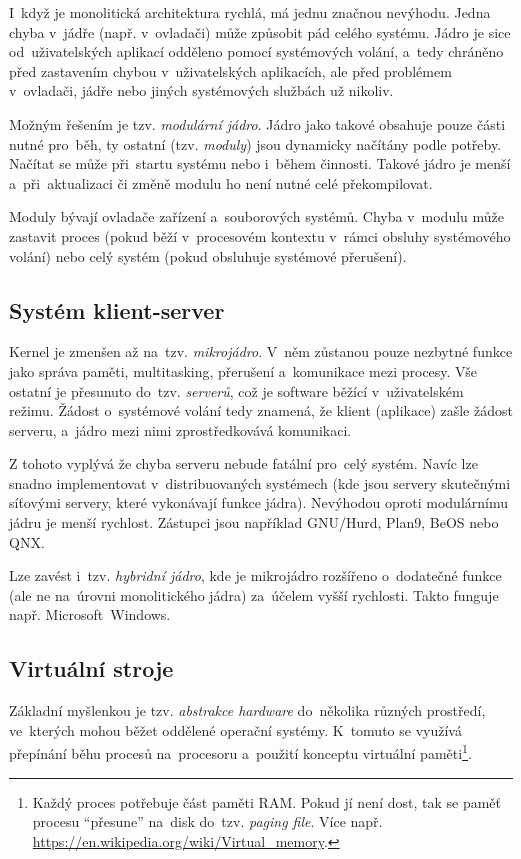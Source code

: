I~když je monolitická architektura rychlá, má jednu značnou nevýhodu. Jedna chyba v~jádře (např. v~ovladači) může způsobit pád celého systému. Jádro je sice od~uživatelských aplikací odděleno pomocí systémových volání, a~tedy chráněno před zastavením chybou v~uživatelských aplikacích, ale před problémem v~ovladači, jádře nebo jiných systémových službách už nikoliv.

Možným řešením je tzv. \emph{modulární jádro}. Jádro jako takové obsahuje pouze části nutné pro~běh, ty ostatní (tzv. \emph{moduly}) jsou dynamicky načítány podle potřeby. Načítat se může při~startu systému nebo i~během činnosti. Takové jádro je menší a~při~aktualizaci či změně modulu ho není nutné celé překompilovat.

Moduly bývají ovladače zařízení a~souborových systémů. Chyba v~modulu může zastavit proces (pokud běží v~procesovém kontextu v~rámci obsluhy systémového volání) nebo celý systém (pokud obsluhuje systémové přerušení).

\subsection{Systém klient-server}

Kernel je zmenšen až na~tzv. \emph{mikrojádro}. V~něm zůstanou pouze nezbytné funkce jako správa paměti, multitasking, přerušení a~komunikace mezi procesy. Vše ostatní je přesunuto do~tzv. \emph{serverů}, což je software běžící v~uživatelském režimu. Žádost o~systémové volání tedy znamená, že klient (aplikace) zašle žádost serveru, a~jádro mezi nimi zprostředkovává komunikaci.

Z tohoto vyplývá že chyba serveru nebude fatální pro~celý systém. Navíc lze snadno implementovat v~distribuovaných systémech (kde jsou servery skutečnými síťovými servery, které vykonávají funkce jádra). Nevýhodou oproti modulárnímu jádru je menší rychlost. Zástupci jsou například GNU/Hurd, Plan9, BeOS nebo QNX.

Lze zavést i~tzv. \emph{hybridní jádro}, kde je mikrojádro rozšířeno o~dodatečné funkce (ale ne na~úrovni monolitického jádra) za~účelem vyšší rychlosti. Takto funguje např. Microsoft~Windows.

\subsection{Virtuální stroje}

Základní myšlenkou je tzv. \emph{abstrakce hardware} do~několika různých prostředí, ve~kterých mohou běžet oddělené operační systémy. K~tomuto se využívá přepínání běhu procesů na~procesoru a~použití konceptu virtuální paměti\footnote{Každý proces potřebuje část paměti RAM. Pokud jí není dost, tak se paměť procesu \enquote{přesune} na~disk do~tzv. \emph{paging file}. Více např. \url{https://en.wikipedia.org/wiki/Virtual_memory}.}.

